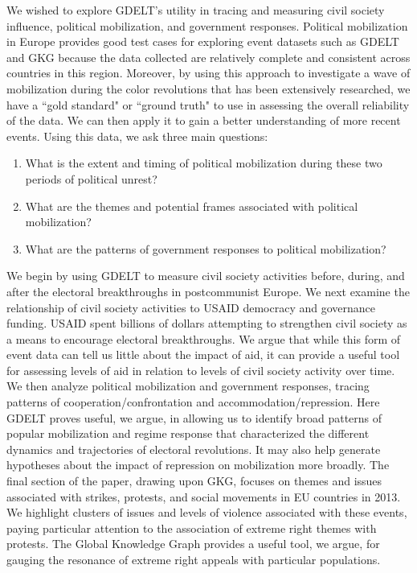 \documentclass[10pt]{article}
\begin{document}
We wished to explore GDELT's utility in tracing and measuring civil society influence, political mobilization, and government responses.  Political mobilization in Europe provides  good test cases for exploring event datasets such as GDELT and GKG because the data collected are relatively complete and consistent across countries in this region.  Moreover, by using this approach to investigate a wave of mobilization during the color revolutions that has been extensively researched,  we have a ``gold standard" or ``ground truth" to use in assessing the overall reliability of the data. We can then apply it to gain a better understanding of more recent events.  Using this data, we ask three main questions:
\begin{enumerate}
\item What is the extent and timing of political mobilization during these two periods of political unrest? 
\item What are the themes and potential frames associated with political mobilization?
\item What are the patterns of government responses to political mobilization?
\end{enumerate}
We begin by using GDELT to measure civil society activities before, during, and after the electoral breakthroughs in postcommunist Europe.  We next examine the relationship of civil society activities to USAID democracy and governance funding.  USAID spent billions of dollars attempting to strengthen civil society as a means to encourage electoral breakthroughs.  We argue that while this form of event data can tell us little about the impact of aid, it can provide a useful tool for assessing levels of aid in relation to levels of civil society activity over time.  We then analyze political mobilization and government responses, tracing patterns of cooperation/confrontation and accommodation/repression.  Here GDELT proves useful, we argue, in allowing us to identify broad patterns of popular mobilization and regime response that characterized the different dynamics and trajectories of electoral revolutions.  It may also help generate hypotheses about the impact of repression on mobilization more broadly.  The final section of the paper, drawing upon GKG, focuses on themes and issues associated with strikes, protests, and social movements in EU countries in 2013.  We highlight clusters of issues and levels of violence associated with these events, paying particular attention to the association of extreme right themes with protests. The Global Knowledge Graph provides a useful tool, we argue, for gauging the resonance of extreme right appeals with particular populations.
\end{document}
